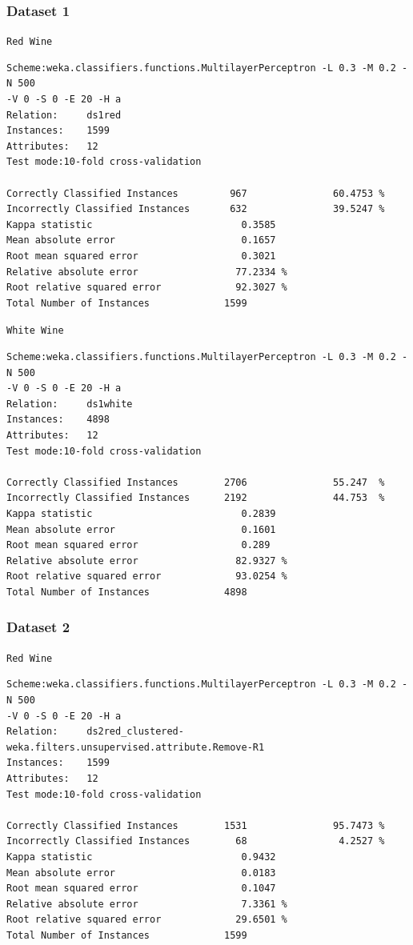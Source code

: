 \documentclass[a4paper,12pt,openany]{report}
\newenvironment{wekaconsole}[1][]{

	\par \noindent
	\begin{samepage}
	\texttt{#1}
	\begin{mdframed}
	\small
	\ttfamily
}{
	\end{mdframed}
	\end{samepage}
}
\begin{document}
\subsubsection*{Dataset 1}
\begin{wekaconsole}[Red Wine]
\begin{verbatim}
Scheme:weka.classifiers.functions.MultilayerPerceptron -L 0.3 -M 0.2 -N 500
-V 0 -S 0 -E 20 -H a
Relation:     ds1red
Instances:    1599
Attributes:   12
Test mode:10-fold cross-validation

Correctly Classified Instances         967               60.4753 %
Incorrectly Classified Instances       632               39.5247 %
Kappa statistic                          0.3585
Mean absolute error                      0.1657
Root mean squared error                  0.3021
Relative absolute error                 77.2334 %
Root relative squared error             92.3027 %
Total Number of Instances             1599
\end{verbatim}
\end{wekaconsole}

\begin{wekaconsole}[White Wine]
\begin{verbatim}
Scheme:weka.classifiers.functions.MultilayerPerceptron -L 0.3 -M 0.2 -N 500
-V 0 -S 0 -E 20 -H a
Relation:     ds1white
Instances:    4898
Attributes:   12
Test mode:10-fold cross-validation

Correctly Classified Instances        2706               55.247  %
Incorrectly Classified Instances      2192               44.753  %
Kappa statistic                          0.2839
Mean absolute error                      0.1601
Root mean squared error                  0.289 
Relative absolute error                 82.9327 %
Root relative squared error             93.0254 %
Total Number of Instances             4898     
\end{verbatim}
\end{wekaconsole}

\clearpage

\subsubsection*{Dataset 2}
\begin{wekaconsole}[Red Wine]
\begin{verbatim}
Scheme:weka.classifiers.functions.MultilayerPerceptron -L 0.3 -M 0.2 -N 500
-V 0 -S 0 -E 20 -H a
Relation:     ds2red_clustered-weka.filters.unsupervised.attribute.Remove-R1
Instances:    1599
Attributes:   12
Test mode:10-fold cross-validation

Correctly Classified Instances        1531               95.7473 %
Incorrectly Classified Instances        68                4.2527 %
Kappa statistic                          0.9432
Mean absolute error                      0.0183
Root mean squared error                  0.1047
Relative absolute error                  7.3361 %
Root relative squared error             29.6501 %
Total Number of Instances             1599
\end{verbatim}
\end{wekaconsole}
\end{document}
